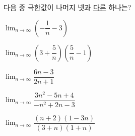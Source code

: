 다음 중 극한값이 나머지 넷과 \underline{다른} 하나는?
\begin{choicesii}{\rule[-3ex]{0pt}{8ex}$\displaystyle\lim_{n\to\infty}\left(-\dfrac{1}{n}-3\right)$}{\rule[-3ex]{0pt}{8ex}$\displaystyle\lim_{n\to\infty}\left(3+\dfrac{5}{n}\right)\!\left(\dfrac{5}{n}-1\right)$}{\rule[-3ex]{0pt}{8ex}$\displaystyle\lim_{n\to\infty}\dfrac{6n-3}{2n+1}$}{\rule[-3ex]{0pt}{8ex}$\displaystyle\lim_{n\to\infty}\dfrac{3n^2-5n+4}{-n^2+2n-3}$}{\rule[-3ex]{0pt}{8ex}$\displaystyle\lim_{n\to\infty}\dfrac{(n+2)(1-3n)}{(3+n)(1+n)}$}\end{choicesii}
